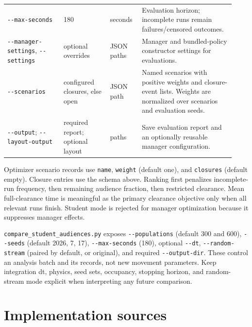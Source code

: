 \documentclass[11pt]{article}
\begin{document}
{\begin{longtable}{@{}p{0.23\linewidth}p{0.19\linewidth}p{0.13\linewidth}p{0.38\linewidth}@{}}
\texttt{-\allowbreak{}-\allowbreak{}max-\allowbreak{}seconds} & 180 & seconds & Evaluation horizon; incomplete runs remain failures/censored outcomes. \\

\texttt{-\allowbreak{}-\allowbreak{}manager-\allowbreak{}settings}, \texttt{-\allowbreak{}-\allowbreak{}settings} & optional overrides & JSON paths & Manager and bundled-policy constructor settings for evaluations. \\

\texttt{-\allowbreak{}-\allowbreak{}scenarios} & configured closures, else open & JSON path & Named scenarios with positive weights and closure-event lists. Weights are normalized over scenarios and evaluation seeds. \\

\texttt{-\allowbreak{}-\allowbreak{}output}; \texttt{-\allowbreak{}-\allowbreak{}layout-\allowbreak{}output} & required report; optional layout & paths & Save evaluation report and an optionally reusable manager configuration. \\

\end{longtable}

}

Optimizer scenario records use \texttt{name}, \texttt{weight} (default one), and \texttt{closures} (default empty). Closure entries use the schema above. Ranking first penalizes incomplete-run frequency, then remaining audience fraction, then restricted clearance. Mean full-clearance time is meaningful as the primary clearance objective only when all relevant runs finish. Student mode is rejected for manager optimization because it suppresses manager effects.


\texttt{compare\_\allowbreak{}student\_\allowbreak{}audiences.\allowbreak{}py} exposes \texttt{-\allowbreak{}-\allowbreak{}populations} (default 300 and 600), \texttt{-\allowbreak{}-\allowbreak{}seeds} (default 2026, 7, 17), \texttt{-\allowbreak{}-\allowbreak{}max-\allowbreak{}seconds} (180), optional \texttt{-\allowbreak{}-\allowbreak{}dt}, \texttt{-\allowbreak{}-\allowbreak{}random-\allowbreak{}stream} (paired by default, or original), and required \texttt{-\allowbreak{}-\allowbreak{}output-\allowbreak{}dir}. These control an analysis batch and its records, not new movement parameters. Keep integration dt, physics, seed sets, occupancy, stopping horizon, and random-stream mode explicit when interpreting any future comparison.


\section{Implementation sources}
\end{document}
